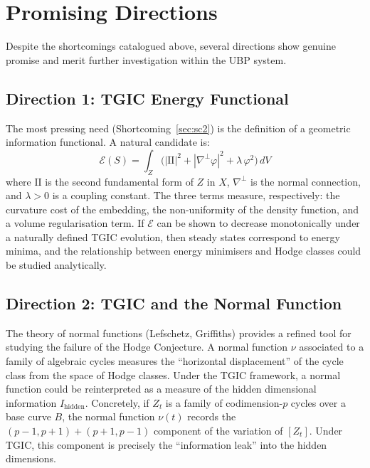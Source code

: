 \documentclass[11pt,a4paper]{article}
\theoremstyle{definition}
\theoremstyle{plain}
\begin{document}
\section{Promising Directions}\label{sec:directions}

Despite the shortcomings catalogued above, several directions show genuine promise and merit further investigation within the UBP system.

\subsection{Direction 1: TGIC Energy Functional}

The most pressing need (Shortcoming~\ref{sec:sc2}) is the definition of a geometric information functional. A natural candidate is:
\begin{equation}\label{eq:energy}
\mathcal{E}(S) = \int_{Z} \!\bigl(|\mathrm{I\!I}|^{2} + |\nabla^{\!\perp}\!\varphi|^{2} + \lambda\, \varphi^{2}\bigr)\, dV
\end{equation}
where $\mathrm{I\!I}$ is the second fundamental form of $Z$ in $X$, $\nabla^{\perp}$ is the normal connection, and $\lambda > 0$ is a coupling constant. The three terms measure, respectively: the curvature cost of the embedding, the non-uniformity of the density function, and a volume regularisation term. If $\mathcal{E}$ can be shown to decrease monotonically under a naturally defined TGIC evolution, then steady states correspond to energy minima, and the relationship between energy minimisers and Hodge classes could be studied analytically.

\subsection{Direction 2: TGIC and the Normal Function}

The theory of normal functions (Lefschetz, Griffiths) provides a refined tool for studying the failure of the Hodge Conjecture. A normal function $\nu$ associated to a family of algebraic cycles measures the ``horizontal displacement'' of the cycle class from the space of Hodge classes. Under the TGIC framework, a normal function could be reinterpreted as a measure of the hidden dimensional information $I_{\mathrm{hidden}}$. Concretely, if $Z_t$ is a family of codimension-$p$ cycles over a base curve $B$, the normal function $\nu(t)$ records the $(p-1,p+1) + (p+1,p-1)$ component of the variation of $[Z_t]$. Under TGIC, this component is precisely the ``information leak'' into the hidden dimensions.
\end{document}
